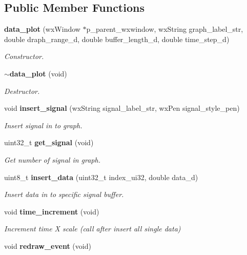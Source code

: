 \subsection*{Public Member Functions}
\begin{DoxyCompactItemize}
\item 
\textbf{ data\+\_\+plot} (wx\+Window $\ast$p\+\_\+parent\+\_\+wxwindow, wx\+String graph\+\_\+label\+\_\+str, double draph\+\_\+range\+\_\+d, double buffer\+\_\+length\+\_\+d, double time\+\_\+step\+\_\+d)
\begin{DoxyCompactList}\small\item\em Constructor. \end{DoxyCompactList}\item 
\textbf{ $\sim$data\+\_\+plot} (void)
\begin{DoxyCompactList}\small\item\em Destructor. \end{DoxyCompactList}\item 
void \textbf{ insert\+\_\+signal} (wx\+String signal\+\_\+label\+\_\+str, wx\+Pen signal\+\_\+style\+\_\+pen)
\begin{DoxyCompactList}\small\item\em Insert signal in to graph. \end{DoxyCompactList}\item 
uint32\+\_\+t \textbf{ get\+\_\+signal} (void)
\begin{DoxyCompactList}\small\item\em Get number of signal in graph. \end{DoxyCompactList}\item 
uint8\+\_\+t \textbf{ insert\+\_\+data} (uint32\+\_\+t index\+\_\+ui32, double data\+\_\+d)
\begin{DoxyCompactList}\small\item\em Insert data in to specific signal buffer. \end{DoxyCompactList}\item 
void \textbf{ time\+\_\+increment} (void)
\begin{DoxyCompactList}\small\item\em Increment time X scale (call after insert all single data) \end{DoxyCompactList}\item 
void {\bfseries redraw\+\_\+event} (void)
\end{DoxyCompactItemize}
